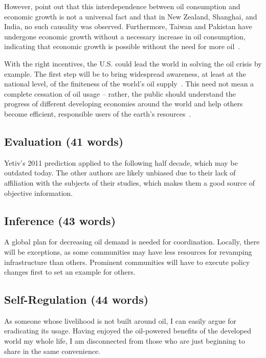 \documentclass[12pt,letterpaper]{article}
\begin{document}
However, \citet[p. 220]{park2014} point out that this interdependence between
oil consumption and economic growth is not a universal fact and that in New
Zealand, Shanghai, and India, no such causality was observed. Furthermore,
Taiwan and Pakistan have undergone economic growth without a necessary increase
in oil consumption, indicating that economic growth is possible without the
need for more oil~\citep[p. 222]{park2014}.

With the right incentives, the U.S. could lead the world in solving the oil
crisis by example. The first step will be to bring widespread awareness, at
least at the national level, of the finiteness of the world's oil
supply~\citep[p. 289]{yetiv2011}. This need not mean a complete cessation of
oil usage -- rather, the public should understand the progress of different
developing economies around the world and help others become efficient,
responsible users of the earth's resources~\citep[p. 1361]{halkos2011}.

\subsection*{Evaluation (41 words)}   %

Yetiv's 2011 prediction applied to the following half decade, which may be
outdated today. The other authors are likely unbiased due to their lack of
affiliation with the subjects of their studies, which makes them a good source
of objective information.

\subsection*{Inference (43 words)}   %

A global plan for decreasing oil demand is needed for coordination. Locally,
there will be exceptions, as some communities may have less resources for
revamping infrastructure than others. Prominent communities will have to
execute policy changes first to set an example for others.

\subsection*{Self-Regulation (44 words)}   %

As someone whose livelihood is not built around oil, I can easily argue for
eradicating its usage. Having enjoyed the oil-powered benefits of the developed
world my whole life, I am disconnected from those who are just beginning to
share in the same convenience.

\newpage


\end{document}
